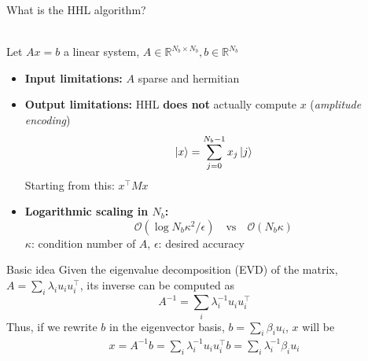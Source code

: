 \begin{frame}{What is the HHL algorithm?}

     \\
    Let $Ax = b$ a linear system, $A\in\mathbb{R}^{N_b \times N_b}, b \in \mathbb{R}^{N_b}$
    \vspace{\baselineskip}
    \begin{itemize}
        \item \textbf{Input limitations:} $A$ sparse and hermitian
        \item \textbf{Output limitations:}
            HHL \textbf{does not} actually compute $x$ (\textit{amplitude encoding})
            \begin{equation*}
                \ket{x} = \sum_{j=0}^{N_b-1} x_j \ket{j}
            \end{equation*}
            Starting from this: $x^\top M x$
        \item \textbf{Logarithmic scaling in $N_b$:} \\ 
        \begin{equation*}
            \mathcal{O}(\log N_b \kappa^2/\epsilon) \quad \text{vs} \quad \mathcal{O}(N_b \kappa)
        \end{equation*}
        $\kappa$: condition number of $A$, $\epsilon$: desired accuracy
    \end{itemize}
\end{frame}

\begin{frame}{Basic idea}
    Given the eigenvalue decomposition (EVD) of the matrix, $A = \sum_i \lambda_i{u}_i{u}_i^\top$, its inverse can be computed as
    \begin{equation*}
        A^{-1} = \sum_i \lambda_i^{-1}{u}_i{u}_i^\top
    \end{equation*}
    Thus, if we rewrite ${b}$ in the eigenvector basis, ${b} = \sum_i \beta_i {u}_i$, ${x}$ will be
    \begin{align*}
        {x} 
        = A^{-1}{b}
        = \sum_i \lambda_i^{-1}{u}_i{u}_i^\top {b}
        = \sum_i \lambda_i^{-1} \beta_i {u}_i
    \end{align*}
\end{frame}

